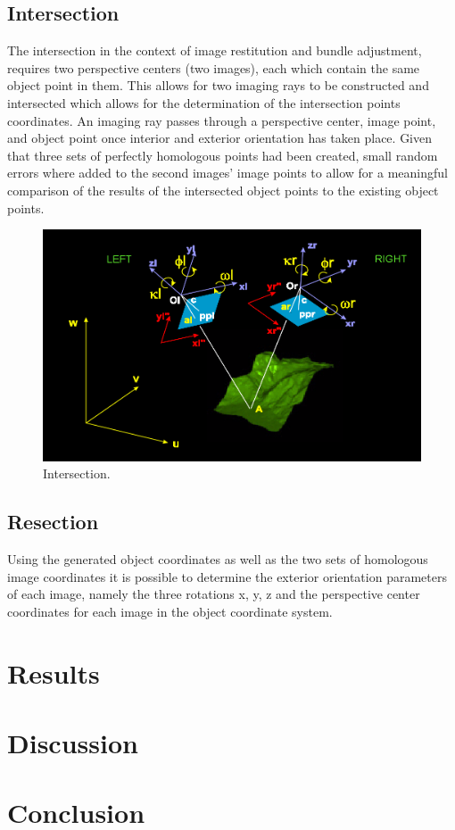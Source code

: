 \documentclass{article}
\begin{document}
\subsection{Intersection}
The intersection in the context of image restitution and bundle adjustment, requires two perspective centers (two images),
each which contain the same object point in them.
This allows for two imaging rays to be constructed and intersected which allows for the determination of the intersection points coordinates.
An imaging ray passes through a perspective center, image point, and object point once interior and exterior orientation has taken place.
Given that three sets of perfectly homologous points had been created, small random errors where added to the second images' image points
to allow for a meaningful comparison of the results of the intersected object points to the existing object points.

\begin{figure}[h!]
\centering
\caption{Intersection.}
\includegraphics[scale=0.2]{intersection}
\end{figure}


\subsection{Resection}
Using the generated object coordinates as well as the two sets of homologous image coordinates
it is possible to determine the exterior orientation parameters of each image, namely the three rotations
x, y, z and the perspective center coordinates for each image in the object coordinate system. 



\section{Results}

\section{Discussion}

\section{Conclusion}
\end{document}
